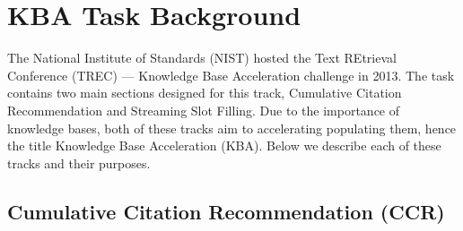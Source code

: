 \section{KBA Task Background}
\label{sec:kbatask}
The National Institute of Standards (NIST) hosted the
Text REtrieval Conference (TREC) --- Knowledge Base Acceleration challenge in 2013. The task
contains two main sections designed for this track, Cumulative Citation Recommendation 
and Streaming Slot Filling. Due to the importance of knowledge bases, both of these 
tracks aim to accelerating populating them, hence the title Knowledge Base Acceleration (KBA).
Below we describe each of these tracks and their purposes.

\subsection{Cumulative Citation Recommendation (CCR)}

